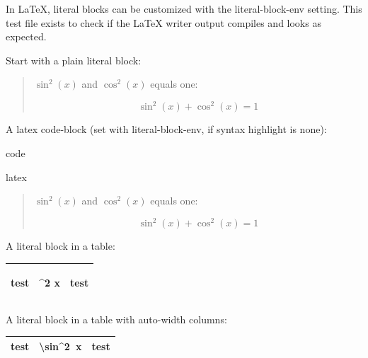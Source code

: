 \documentclass[a4paper]{article}
\newlength{\DUtablewidth} %
\newlength{\ttemwidth}
\begin{document}
In LaTeX, literal blocks can be customized with the \textquotedbl{}literal-block-env\textquotedbl{}
setting. This test file exists to check if the LaTeX writer output compiles
and looks as expected.

Start with a plain literal block:

\begin{quote}
\begin{verbatimtab}
$\sin^2(x)$ and $\cos^2(x)$ equals one:

\[
   \sin^2(x) + \cos^2(x) = 1 %
\]
\end{verbatimtab}
\end{quote}

A latex \textquotedbl{}code-block\textquotedbl{} (set with \textquotedbl{}literal-block-env\textquotedbl{}, if syntax
highlight is \textquotedbl{}none\textquotedbl{}):

\begin{DUclass}{code}
\begin{DUclass}{latex}
\begin{quote}
\begin{verbatimtab}
$\sin^2(x)$ and $\cos^2(x)$ equals one:

\[
   \sin^2(x) + \cos^2(x) = 1 %
\]
\end{verbatimtab}
\end{quote}
\end{DUclass}
\end{DUclass}

A literal block in a table:

\setlength{\DUtablewidth}{\linewidth}%
\begin{longtable*}{|p{0.063\DUtablewidth}|p{0.145\DUtablewidth}|p{0.063\DUtablewidth}|}
\hline

test
 & 
\begin{minipage}{8\ttemwidth}
\begin{verbatimtab}
\sin^2 x
\end{verbatimtab}
\end{minipage}
 & 
test
 \\
\hline
\end{longtable*}

A literal block in a table with auto-width columns:

\begin{longtable*}{|l|l|l|}
\hline
test & 
\ttfamily\raggedright
\textbackslash{}sin\textasciicircum{}2~x
 & test \\
\hline
\end{longtable*}
\end{document}
